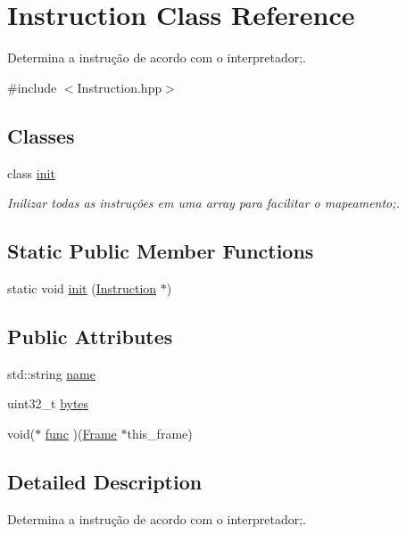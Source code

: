 \hypertarget{class_instruction}{}\section{Instruction Class Reference}
\label{class_instruction}


Determina a instrução de acordo com o interpretador;.  




{\ttfamily \#include $<$Instruction.\+hpp$>$}

\subsection*{Classes}
\begin{DoxyCompactItemize}
\item 
class \hyperlink{class_instruction_1_1init}{init}
\begin{DoxyCompactList}\small\item\em Inilizar todas as instruções em uma array para facilitar o mapeamento;. \end{DoxyCompactList}\end{DoxyCompactItemize}
\subsection*{Static Public Member Functions}
\begin{DoxyCompactItemize}
\item 
static void \hyperlink{class_instruction_a145a172552303c9cbd8a5856e31a701b}{init} (\hyperlink{class_instruction}{Instruction} $\ast$)
\end{DoxyCompactItemize}
\subsection*{Public Attributes}
\begin{DoxyCompactItemize}
\item 
std\+::string \hyperlink{class_instruction_abfd1615a8bb140e70b3724214deee7df}{name}
\item 
uint32\+\_\+t \hyperlink{class_instruction_a1052c075af597277407bece6db3f2bef}{bytes}
\item 
void($\ast$ \hyperlink{class_instruction_a1f4648eed807151537ef72c78d65081f}{func} )(\hyperlink{struct_frame}{Frame} $\ast$this\+\_\+frame)
\end{DoxyCompactItemize}


\subsection{Detailed Description}
Determina a instrução de acordo com o interpretador;. 

